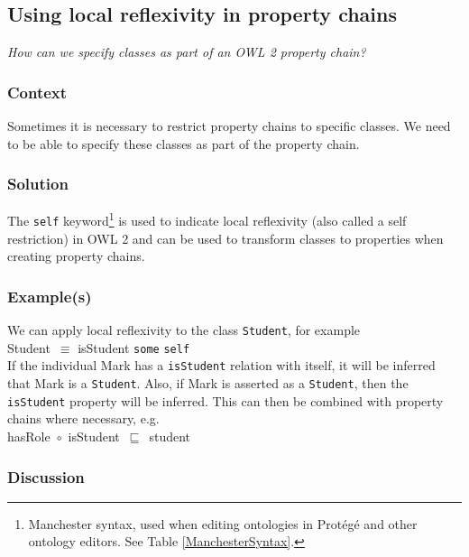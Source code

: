\subsection{Using local reflexivity in property chains}

\emph{How can we specify classes as part of an \ac{OWL} 2 property chain?}

\subsubsection{Context}

Sometimes it is necessary to restrict property chains to specific classes. We need to be able to specify these classes as part of the property chain.

\subsubsection{Solution}

\label{LocalReflexivity}
The \texttt{self} keyword\footnote{Manchester syntax, used when editing ontologies in Prot\'eg\'e and other ontology editors. See Table \ref{ManchesterSyntax}.} is used to indicate local reflexivity (also called a self restriction) in \ac{OWL} 2 and can be used to transform classes to properties when creating property chains.

\subsubsection{Example(s)}

We can apply local reflexivity to the class \texttt{Student}, for example\\

\noindent
Student~\ensuremath{\equiv} isStudent \texttt{some} \texttt{self}\\

If the individual Mark has a \texttt{isStudent} relation with itself, it will be inferred that Mark is a \texttt{Student}. Also, if Mark is asserted as a \texttt{Student}, then the \texttt{isStudent} property will be inferred. This can then be combined with property chains where necessary, e.g.\\

\noindent
hasRole~\ensuremath{\circ}~isStudent~\ensuremath{\sqsubseteq}~student

\subsubsection{Discussion}


